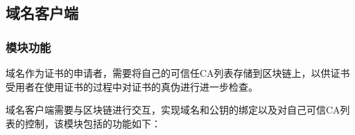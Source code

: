 










	





\subsection{域名客户端}

\subsubsection{模块功能}

域名作为证书的申请者，需要将自己的可信任CA列表存储到区块链上，以供证书受用者在使用证书的过程中对证书的真伪进行进一步检查。

域名客户端需要与区块链进行交互，实现域名和公钥的绑定以及对自己可信CA列表的控制，该模块包括的功能如下：

